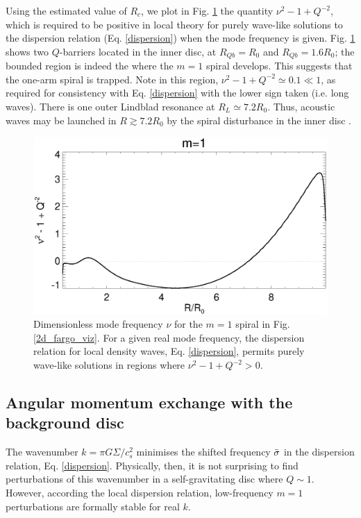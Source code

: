 
Using the estimated value of $R_c$, we plot in
Fig. \ref{fargo_qbarrier} the quantity $\nu^2 - 1 + Q^{-2}$, which is
required to be positive in local theory for purely wave-like
solutions to the dispersion relation (Eq. \ref{dispersion}) when the
mode frequency is given. %
Fig. \ref{fargo_qbarrier} shows two $Q$-barriers located in
the inner disc, at $R_{Qb}=R_0$ and $R_{Qb}=1.6R_0$; the bounded region is indeed the
where the $m=1$ spiral develops. This suggests that the one-arm 
spiral is trapped. Note in this region, $\nu^2 - 1 + 
Q^{-2}\simeq 0.1\ll 1$, as required for consistency with
Eq. \ref{dispersion} with the lower sign taken (i.e. long waves).  
There is one outer Lindblad resonance at $R_L\simeq
7.2R_0$. Thus, acoustic waves may be launched in $R\gtrsim 7.2R_0$ by
the spiral disturbance in the inner disc \citep{lin11b}. 

\begin{figure}
  \includegraphics[width=\linewidth]{figures/m1_analysis_Qbar_fargo.ps} 
  \caption{Dimensionless mode frequency $\nu$ for the $m=1$ spiral in
    Fig. \ref{2d_fargo_viz}. For a given real mode frequency, the
    dispersion relation for local density waves, Eq. \ref{dispersion},
    permits purely wave-like solutions in regions where $\nu^2 - 1 +
    Q^{-2}>0$.    
    \label{fargo_qbarrier}} 
\end{figure}

\subsection{Angular momentum exchange with the background disc}  
The wavenumber $k = \pi G\Sigma/c_s^2$ minimises the shifted frequency
$\bar{\sigma}$ in the dispersion relation, Eq. \ref{dispersion}.  
Physically, then, it is not
surprising to find perturbations of this wavenumber in a
self-gravitating disc where $Q\sim 1$. However, according the
local dispersion relation, low-frequency $m=1$ perturbations are
formally stable for real $k$.  

